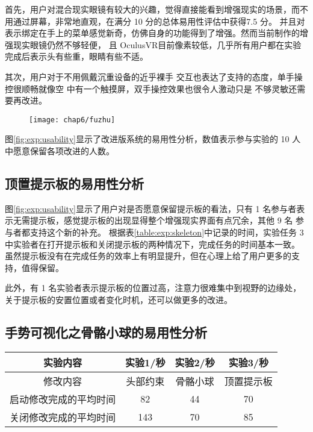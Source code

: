 首先，用户对混合现实眼镜有较大的兴趣，觉得直接能看到增强现实的场景，而不用通过屏幕，非常地直观，在满分 10 分的总体易用性评估中获得7.5 分。
并且对表示绑定在手上的菜单感觉新奇，仿佛自身的功能得到了增强。然而当前制作的增强现实眼镜仍然不够轻便，
且 OculusVR目前像素较低，几乎所有用户都在实验完成后表示头有些重，眼睛有些不适。

其次，用户对于不用佩戴沉重设备的近乎裸手
交互也表达了支持的态度，单手操控很顺畅就像空
中有一个触摸屏，双手操控效果也很令人激动只是
不够灵敏还需要再改进。

\begin{figure}[!htp]
  \centering
  \texttt{[image: chap6/fuzhu]}
\end{figure}

图\ref{fig:exp:usability}显示了改进版系统的易用性分析，数值表示参与实验的 10 人中愿意保留各项改进的人数。

\subsection{顶置提示板的易用性分析}
图\ref{fig:exp:usability}显示了用户对是否愿意保留提示板的看法，只有 1 名参与者表示无需提示板，感觉提示板的出现显得整个增强现实界面有点冗余，其他 9 名
参与者都支持这个新的补充。
根据表\ref{table:exp:skeleton}中记录的时间，实验任务 3 中实验者在打开提示板和关闭提示板的两种情况下，完成任务的时间基本一致。
虽然提示板没有在完成任务的效率上有明显提升，但在心理上给了用户更多的支持，值得保留。

此外，有 1 名实验者表示提示板的位置过高，注意力很难集中到视野的边缘处，关于提示板的安置位置或者变化时机，还可以做更多的改进。

\subsection{手势可视化之骨骼小球的易用性分析}

\begin{table}[!hpb]
  \centering
  \begin{tabular}{@{}cccc@{}} \toprule
    实验内容 & 实验1/秒 & 实验2/秒 & 实验3/秒 \\
	\midrule
    修改内容 & 头部约束 & 骨骼小球 & 顶置提示板 \\
    启动修改完成的平均时间 & 82 & 44 & 70 \\
    关闭修改完成的平均时间 & 143 & 70 & 85 \\
	\bottomrule
  \end{tabular}
\end{table}

